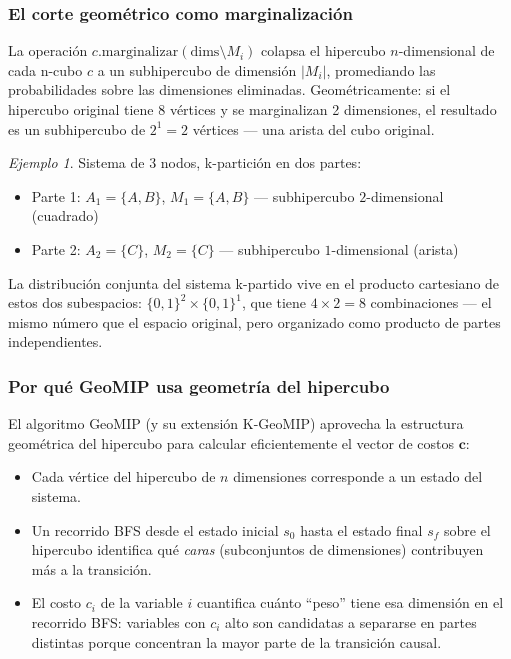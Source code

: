 \documentclass[12pt,letterpaper]{article}
\theoremstyle{definition}
\theoremstyle{remark}
\newtheorem{example}{Ejemplo}[section]
\begin{document}
\subsubsection*{El corte geométrico como marginalización}

La operación $c.\mathrm{marginalizar}(\mathrm{dims} \setminus M_i)$ colapsa el
hipercubo $n$-dimensional de cada n-cubo $c$ a un subhipercubo de dimensión $|M_i|$,
promediando las probabilidades sobre las dimensiones eliminadas.
Geométricamente: si el hipercubo original tiene 8 vértices y se marginalizan 2 dimensiones,
el resultado es un subhipercubo de $2^1 = 2$ vértices --- una arista del cubo original.

\begin{example}
Sistema de 3 nodos, k-partición en dos partes:
\begin{itemize}
  \item Parte 1: $A_1 = \{A, B\}$, $M_1 = \{A, B\}$ --- subhipercubo $2$-dimensional (cuadrado)
  \item Parte 2: $A_2 = \{C\}$, $M_2 = \{C\}$ --- subhipercubo $1$-dimensional (arista)
\end{itemize}
La distribución conjunta del sistema k-partido vive en el producto cartesiano de estos
dos subespacios: $\{0,1\}^2 \times \{0,1\}^1$, que tiene $4 \times 2 = 8$ combinaciones ---
el mismo número que el espacio original, pero organizado como producto de partes independientes.
\end{example}

\subsubsection*{Por qué GeoMIP usa geometría del hipercubo}

El algoritmo GeoMIP (y su extensión K-GeoMIP) aprovecha la estructura geométrica del
hipercubo para calcular eficientemente el vector de costos $\mathbf{c}$:

\begin{itemize}
  \item Cada vértice del hipercubo de $n$ dimensiones corresponde a un estado del sistema.
  \item Un recorrido BFS desde el estado inicial $s_0$ hasta el estado final $s_f$ sobre el
    hipercubo identifica qué \emph{caras} (subconjuntos de dimensiones) contribuyen más
    a la transición.
  \item El costo $c_i$ de la variable $i$ cuantifica cuánto ``peso'' tiene esa dimensión
    en el recorrido BFS: variables con $c_i$ alto son candidatas a separarse en partes
    distintas porque concentran la mayor parte de la transición causal.
\end{itemize}
\end{document}
